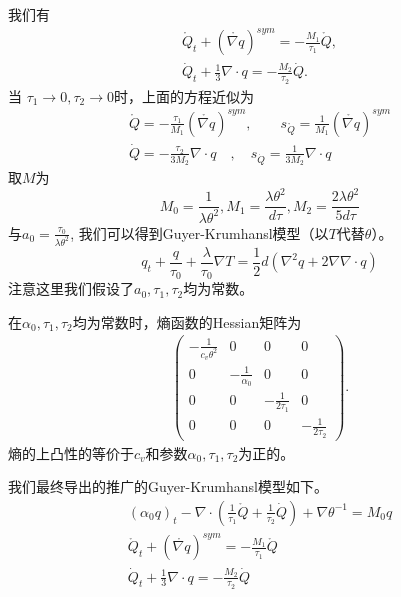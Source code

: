 我们有
\begin{eqnarray*}
\mathring{{Q}}_t+(\mathring{\nabla {q}})^{sym}=-\frac{M_1}{\tau_1}\mathring{{Q}}, \\
\dot{Q}_t+\frac{1}{3} \nabla \cdot {q}=-\frac{M_2}{\tau_2}\dot{Q}.
\end{eqnarray*}
当 $\tau_1 \to 0, \tau_2 \to 0$时，上面的方程近似为
\begin{eqnarray*} 
\mathring{{Q}}=-\frac{\tau_1}{M_1}(\mathring{\nabla {q}})^{sym} ,\quad  \quad s_{\mathring{Q}}=\frac{1}{M_1}(\mathring{\nabla {q}})^{sym} \\
\dot{Q}=-\frac{\tau_2}{3M_2}\nabla \cdot {q} \quad , \quad s_{\dot{Q}}=\frac{1}{3M_2} \nabla \cdot {q}
\end{eqnarray*}
取$M$为
\begin{equation}
M_0=\frac{1}{\lambda \theta^2}, M_1=\frac{\lambda \theta^2}{d\tau}, M_2=\frac{2\lambda \theta^2}{5d\tau}
\end{equation}
与$a_0=\frac{\tau_0}{\lambda \theta^2}$,
我们可以得到Guyer-Krumhansl模型（以$T$代替$\theta$）\cite{jou1996extended}。
\begin{equation}
{q}_t+\frac{{q}}{\tau_0}+\frac{\lambda}{\tau_0}\nabla T=\frac{1}{2}d(\nabla^2 {q}+2\nabla \nabla \cdot {q})
\end{equation}
注意这里我们假设了$a_0,\tau_1,\tau_2$均为常数。

在$\alpha_0,\tau_1,\tau_2$均为常数时，熵函数的Hessian矩阵为
\begin{eqnarray*}
\left(\begin{array}{llll}  -\frac{1}{c_v \theta^2} & 0 & 0 & 0 \\
                                           0  & -\frac{1}{\alpha_0} & 0 & 0 \\
										   0 & 0 & -\frac{1}{2\tau_1} & 0 \\
										   0 & 0 & 0 & -\frac{1}{2\tau_2}
										   \end{array} \right).
\end{eqnarray*}
熵的上凸性的等价于$c_v$和参数$\alpha_0,\tau_1,\tau_2$为正的。

我们最终导出的推广的Guyer-Krumhansl模型如下。
\begin{subequations}\label{eq:EGK}
	\begin{align}
(\alpha_0 {q})_t - \nabla \cdot ({\frac{1}{\tau_1} \mathring{{Q}}}+\frac{1}{\tau_2}\dot{Q})+\nabla \theta^{-1} = M_0 {q} \\
\mathring{{Q}}_t+(\mathring{\nabla {q}})^{sym}=-\frac{M_1}{\tau_1}\mathring{{Q}} \\
\dot{Q}_t+\frac{1}{3} \nabla \cdot {q}=-\frac{M_2}{\tau_2} \dot{Q}
	\end{align}
\end{subequations}

